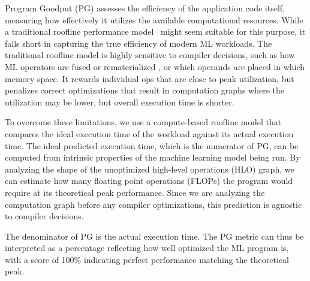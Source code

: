 Program Goodput (PG) assesses the efficiency of the application code itself, measuring how effectively it utilizes the available computational resources. While a traditional roofline performance model~\cite{williams2009roofline} might seem suitable for this purpose, it falls short in capturing the true efficiency of modern ML workloads. The traditional roofline model is highly sensitive to compiler decisions, such as how ML operators are fused or rematerialized \cite{briggs1992rematerialization}, or which operands are placed in which memory space. It rewards individual ops that are close to peak utilization, but penalizes correct optimizations that result in computation graphs where the utilization may be lower, but overall execution time is shorter. 

To overcome these limitations, we use a compute-based roofline model that compares the ideal execution time of the workload against its actual execution time. The ideal predicted execution time, which is the numerator of PG, can be computed from intrinsic properties of the machine learning model being run. By analyzing the shape of the unoptimized  high-level operations (HLO) graph, we can estimate how many floating point operations (FLOPs) the program would require at its theoretical peak performance. Since we are analyzing the computation graph before any compiler optimizations, this prediction is agnostic to compiler decisions. 

The denominator of PG is the actual execution time. The PG metric can thus be interpreted as a percentage reflecting how well optimized the ML program is, with a score of 100\% indicating perfect performance matching the theoretical peak.




